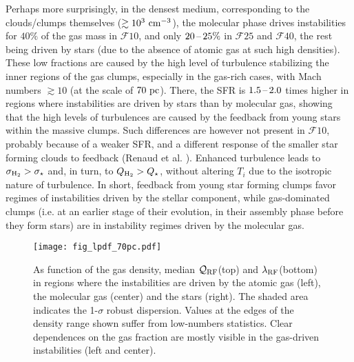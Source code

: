 \documentclass[useAMS,usenatbib]{mnras}
\newcommand{\qrf}{\ensuremath{\mathcal{Q}_{\rm RF}}\xspace}
\newcommand{\lrf}{\ensuremath{\lambda_{\rm RF}}\xspace}
\newcommand{\gs}{\ensuremath{\mathcal{F}10}\xspace}
\newcommand{\gm}{\ensuremath{\mathcal{F}25}\xspace}
\newcommand{\gl}{\ensuremath{\mathcal{F}40}\xspace}
\begin{document}
Perhaps more surprisingly, in the densest medium, corresponding to the clouds/clumps themselves ($\gtrsim 10^3 \mathrm{~cm^{-3}}$), the molecular phase drives instabilities for $40 \%$ of the gas mass in \gs, and only $20\textrm{\,--\,} 25\%$ in \gm and \gl, the rest being driven by stars (due to the absence of atomic gas at such high densities). These low fractions are caused by the high level of turbulence stabilizing the inner regions of the gas clumps, especially in the gas-rich cases, with Mach numbers $\gtrsim 10$ (at the scale of $70 \mathrm{~pc}$). There, the SFR is $1.5\textrm{\,--\,} 2.0$ times higher in regions where instabilities are driven by stars than by molecular gas, showing that the high levels of turbulences are caused by the feedback from young stars within the massive clumps. Such differences are however not present in \gs, probably because of a weaker SFR, and a different response of the smaller star forming clouds to feedback (Renaud et al. \inprep). Enhanced turbulence leads to $\sigma_{\mathrm{H}_2} > \sigma_{\star}$ and, in turn, to $Q_{\mathrm{H}_2} > Q_{\star}$, without altering $T_i$ due to the isotropic nature of turbulence. In short, feedback from young star forming clumps favor regimes of instabilities driven by the stellar component, while gas-dominated clumps (i.e. at an earlier stage of their evolution, in their assembly phase before they form stars) are in instability regimes driven by the molecular gas.

\begin{figure*}
\centering
\texttt{[image: fig\_lpdf\_70pc.pdf]}
\caption{As function of the gas density, median \qrf (top) and \lrf (bottom) in regions where the instabilities are driven by the atomic gas (left), the molecular gas (center) and the stars (right). The shaded area indicates the 1-$\sigma$ robust dispersion. Values at the edges of the density range shown suffer from low-numbers statistics. Clear dependences on the gas fraction are mostly visible in the gas-driven instabilities (left and center).}
\label{fig:lpdf}
\end{figure*}
\end{document}
